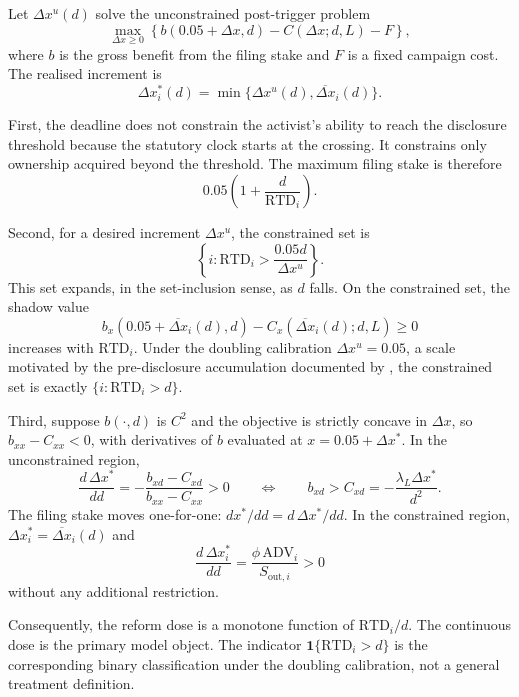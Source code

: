 \begin{proposition}
\label{prop:R2}\label{prop:R3}
Let $\Delta x^u(d)$ solve the unconstrained post-trigger problem
\[
\max_{\Delta x\geq0}
\left\{b(0.05+\Delta x,d)-C(\Delta x;d,L)-F\right\},
\]
where $b$ is the gross benefit from the filing stake and $F$ is a fixed campaign
cost. The realised increment is
\[
\Delta x_i^\ast(d)
=\min\{\Delta x^u(d),\overline{\Delta x}_i(d)\}.
\]

First, the deadline does not constrain the activist's ability to reach the
disclosure threshold because the statutory clock starts at the crossing. It
constrains only ownership acquired beyond the threshold. The maximum filing
stake is therefore
\[
0.05\left(1+\frac{d}{\mathrm{RTD}_i}\right).
\]

Second, for a desired increment $\Delta x^u$, the constrained set is
\[
\left\{i:\mathrm{RTD}_i>\frac{0.05d}{\Delta x^u}\right\}.
\]
This set expands, in the set-inclusion sense, as $d$ falls. On the constrained
set, the shadow value
\[
b_x(0.05+\overline{\Delta x}_i(d),d)
-C_x(\overline{\Delta x}_i(d);d,L)\geq0
\]
increases with $\mathrm{RTD}_i$. Under the doubling calibration
$\Delta x^u=0.05$, a scale motivated by the pre-disclosure accumulation
documented by \textcite{collindufresnefos2015}, the constrained set is exactly
$\{i:\mathrm{RTD}_i>d\}$.

Third, suppose $b(\cdot,d)$ is $C^2$ and the objective is strictly concave in
$\Delta x$, so $b_{xx}-C_{xx}<0$, with derivatives of $b$ evaluated at
$x=0.05+\Delta x^\ast$. In the unconstrained region,
\begin{equation}
\frac{d\,\Delta x^\ast}{dd}
=-\frac{b_{xd}-C_{xd}}{b_{xx}-C_{xx}}>0
\qquad\Longleftrightarrow\qquad
b_{xd}>C_{xd}=-\frac{\lambda_L\Delta x^\ast}{d^2}.
\label{eq:sc}
\end{equation}
The filing stake moves one-for-one:
$dx^\ast/dd=d\,\Delta x^\ast/dd$. In the constrained region,
$\Delta x_i^\ast=\overline{\Delta x}_i(d)$ and
\[
\frac{d\,\Delta x_i^\ast}{dd}
=\frac{\phi\,\mathrm{ADV}_i}{S_{\mathrm{out},i}}>0
\]
without any additional restriction.

Consequently, the reform dose is a monotone function of
$\mathrm{RTD}_i/d$. The continuous dose is the primary model object. The
indicator $\mathbf{1}\{\mathrm{RTD}_i>d\}$ is the corresponding binary
classification under the doubling calibration, not a general treatment
definition.
\end{proposition}


